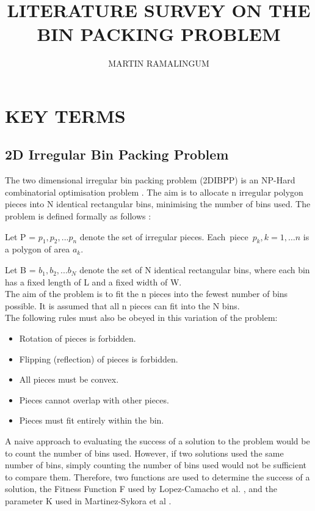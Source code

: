 \documentclass{llncs}
\begin{document}
\title{LITERATURE SURVEY ON THE BIN PACKING PROBLEM}
\author{MARTIN RAMALINGUM}
\maketitle            
\section{KEY TERMS}
\subsection{2D Irregular Bin Packing Problem}
The two dimensional irregular bin packing problem (2DIBPP) is an NP-Hard combinatorial optimisation problem \cite{pandey2021analysis}. The aim is to allocate n irregular polygon pieces into N identical rectangular bins, minimising the number of bins used. The problem is defined formally as follows \cite{guerriero2022hierarchical}: 

Let P = \( p_1, p_2, ... p_n \) denote the set of irregular pieces. 
\mbox{Each piece \(p_k, k = 1, … n\)} is a polygon of area \(a_k\). 

Let B = \( b_1, b_2, ... b_N \) denote the set of N identical rectangular bins, where each bin has a fixed length of L and a fixed width of W. 
\\
The aim of the problem is to fit the n pieces into the fewest number of bins possible. It is assumed that all n pieces can fit into the N bins. \\
The following rules must also be obeyed in this variation of the problem:
\begin{itemize}
    \item Rotation of pieces is forbidden.
    \item Flipping (reflection) of pieces is forbidden.
    \item All pieces must be convex.
    \item Pieces cannot overlap with other pieces.
    \item Pieces must fit entirely within the bin.
\end{itemize}

A naive approach to evaluating the success of a solution to the problem would be to count the number of bins used. However, if two solutions used the same number of bins, simply counting the number of bins used would not be sufficient to compare them. Therefore, two functions are used to determine the success of a solution, the Fitness Function F used by Lopez-Camacho et al. \cite{lopez2014unified}, and the parameter K used in Martinez-Sykora et al \cite{martinez2017matheuristics}.
\end{document}
